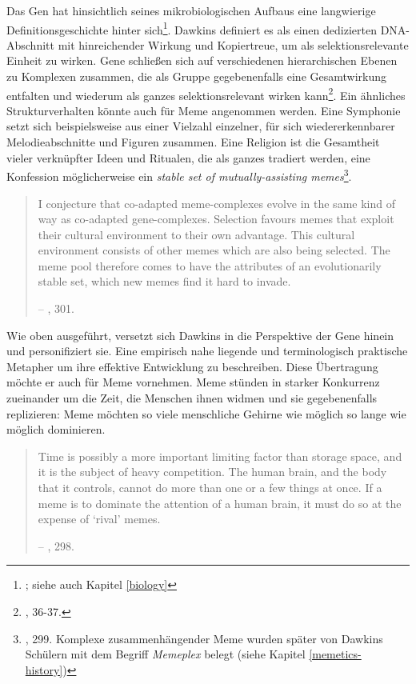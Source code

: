 \documentclass[openany,twoside,twocolumn]{book}
\let\rmarkdownfootnote\footnote%
\def\footnote{\protect\rmarkdownfootnote}
\begin{document}
Das Gen hat hinsichtlich seines mikrobiologischen Aufbaus eine langwierige Definitionsgeschichte hinter sich\footnote{\textcite{gerstein_what_2007}; siehe auch Kapitel \ref{biology}}. Dawkins definiert es als einen dedizierten DNA-Abschnitt mit hinreichender Wirkung und Kopiertreue, um als selektionsrelevante Einheit zu wirken. Gene schließen sich auf verschiedenen hierarchischen Ebenen zu Komplexen zusammen, die als Gruppe gegebenenfalls eine Gesamtwirkung entfalten und wiederum als ganzes selektionsrelevant wirken kann\footnote{\textcite{Dawkinsselfishgene40th2016}, 36-37.}. Ein ähnliches Strukturverhalten könnte auch für Meme angenommen werden. Eine Symphonie setzt sich beispielsweise aus einer Vielzahl einzelner, für sich wiedererkennbarer Melodieabschnitte und Figuren zusammen. Eine Religion ist die Gesamtheit vieler verknüpfter Ideen und Ritualen, die als ganzes tradiert werden, eine Konfession möglicherweise ein \emph{stable set of mutually-assisting memes}\footnote{\textcite{Dawkinsselfishgene40th2016}, 299. Komplexe zusammenhängender Meme wurden später von Dawkins Schülern mit dem Begriff \emph{Memeplex} belegt (siehe Kapitel \ref{memetics-history})}.

\begin{quote}
I conjecture that co-adapted meme-complexes evolve in the same kind of way as co-adapted gene-complexes. Selection favours memes that exploit their cultural environment to their own advantage. This cultural environment consists of other memes which are also being selected. The meme pool therefore comes to have the attributes of an evolutionarily stable set, which new memes find it hard to invade.

-- \textcite{Dawkinsselfishgene40th2016}, 301.
\end{quote}

Wie oben ausgeführt, versetzt sich Dawkins in die Perspektive der Gene hinein und personifiziert sie. Eine empirisch nahe liegende und terminologisch praktische Metapher um ihre effektive Entwicklung zu beschreiben. Diese Übertragung möchte er auch für Meme vornehmen. Meme stünden in starker Konkurrenz zueinander um die Zeit, die Menschen ihnen widmen und sie gegebenenfalls replizieren: Meme möchten so viele menschliche Gehirne wie möglich so lange wie möglich dominieren.

\begin{quote}
Time is possibly a more important limiting factor than storage space, and it is the subject of heavy competition. The human brain, and the body that it controls, cannot do more than one or a few things at once. If a meme is to dominate the attention of a human brain, it must do so at the expense of `rival' memes.

-- \textcite{Dawkinsselfishgene40th2016}, 298.
\end{quote}
\end{document}
